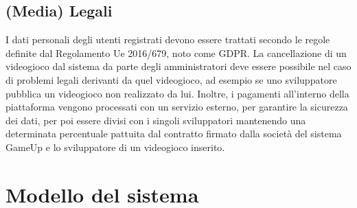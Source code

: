 \subsection{(Media) Legali}
I dati personali degli utenti registrati devono essere trattati secondo le regole definite dal Regolamento Ue 2016/679, noto come GDPR. La cancellazione di un videogioco dal sistema da parte degli amministratori deve essere possibile nel caso di problemi legali derivanti da quel videogioco, ad esempio se uno sviluppatore pubblica un videogioco non realizzato da lui. Inoltre, i pagamenti all’interno della piattaforma vengono processati con un servizio esterno, per garantire la sicurezza dei dati, per poi essere divisi con i singoli sviluppatori mantenendo una determinata percentuale pattuita dal contratto firmato dalla società del sistema GameUp e lo sviluppatore di un videogioco inserito. 

\section{Modello del sistema}
